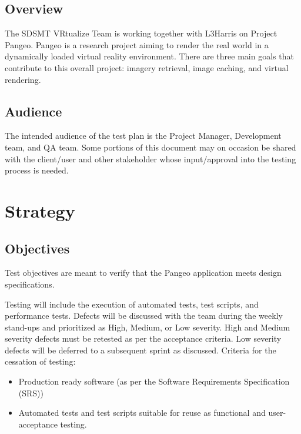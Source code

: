 \documentclass[letterpaper,10pt,english,openany,oneside]{sphinxmanual}
\begin{document}
\section{Overview}
\label{\detokenize{test_plan/intro:overview}}
The SDSMT VRtualize Team is working together with L3Harris on Project Pangeo. Pangeo is a research project aiming to render the real world in a dynamically loaded virtual reality environment. There are three main goals that contribute to this overall project: imagery retrieval, image caching, and virtual rendering.


\section{Audience}
\label{\detokenize{test_plan/intro:audience}}
The intended audience of the test plan is the Project Manager, Development team, and QA team. Some portions of this document may on occasion be shared with the client/user and other stakeholder whose input/approval into the testing process is needed.


\chapter{Strategy}
\label{\detokenize{test_plan/strategy:strategy}}\label{\detokenize{test_plan/strategy:id1}}\label{\detokenize{test_plan/strategy::doc}}

\section{Objectives}
\label{\detokenize{test_plan/strategy:objectives}}
Test objectives are meant to verify that the Pangeo application meets design specifications.

Testing will include the execution of automated tests, test scripts, and performance tests. Defects will be discussed with the team during the weekly stand-ups and prioritized as High, Medium, or Low severity. High and Medium severity defects must be retested as per the acceptance criteria. Low severity defects will be deferred to a subsequent sprint as discussed.
Criteria for the cessation of testing:
\begin{itemize}
\item {} 
Production ready  software (as per the Software Requirements Specification (SRS))

\item {} 
Automated tests and test scripts suitable for reuse as functional and user-acceptance testing.

\end{itemize}
\end{document}
